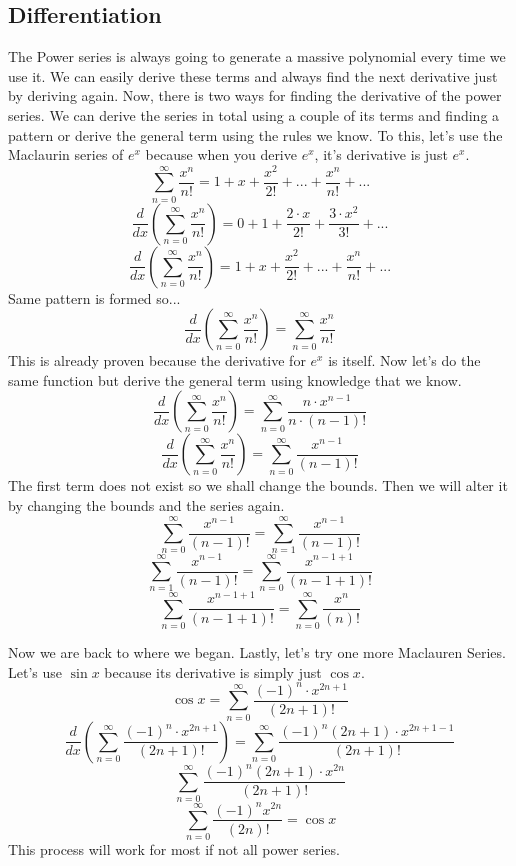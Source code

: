 \documentclass[a4paper,openright, 14pt]{article}
\begin{document}
\subsection{Differentiation}
The Power series is always going to generate a massive polynomial every time we use it. We can easily derive these terms and always find the next derivative just by deriving again. Now, there is two ways for finding the derivative of the power series. We can derive the series in total using a couple of its terms and finding a pattern or derive the general term using the rules we know. To this, let's use the Maclaurin series of $e^x$ because when you derive $e^x$, it's derivative is just $e^x$.
$$\sum _{n=0}^\infty \frac{x^n}{n!}=1+x+\frac{x^2}{2!} +...+\frac{x^n}{n!}+...$$
$$ \frac{d}{dx}(\sum _{n=0}^\infty\frac{x^n}{n!})= 0+1+\frac{2\cdot x}{2!} +\frac{3\cdot x^2}{3!}+ ...$$
$$ \frac{d}{dx}(\sum _{n=0}^\infty\frac{x^n}{n!})=1+x+\frac{x^2}{2!} +...+\frac{x^n}{n!}+...$$
Same pattern is formed so...
$$ \frac{d}{dx}(\sum _{n=0}^\infty\frac{x^n}{n!})=\sum _{n=0}^\infty \frac{x^n}{n!}$$
This is already proven because the derivative for $e^x $ is itself. Now let's do the same function but derive the general term using knowledge that we know.
$$ \frac{d}{dx}(\sum _{n=0}^\infty\frac{x^n}{n!})=\sum _{n=0}^\infty\frac{n \cdot x^{n-1}}{n \cdot (n-1)!}$$
$$ \frac{d}{dx}(\sum _{n=0}^\infty\frac{x^n}{n!})=\sum _{n=0}^\infty\frac{ x^{n-1}}{ (n-1)!}$$
The first term does not exist so we shall change the bounds. Then we will alter it by changing the bounds and the series again. 
$$\sum _{n=0}^\infty\frac{ x^{n-1}}{ (n-1)!}=\sum _{n=1}^\infty\frac{ x^{n-1}}{ (n-1)!}$$
$$\sum _{n=1}^\infty\frac{ x^{n-1}}{ (n-1)!}=\sum _{n=0}^\infty\frac{ x^{n-1+1}}{ (n-1+1)!}$$
$$\sum _{n=0}^\infty\frac{ x^{n-1+1}}{ (n-1+1)!}=\sum _{n=0}^\infty\frac{ x^{n}}{ (n)!}$$

Now we are back to where we began. Lastly, let's try one more Maclauren Series. Let's use $\sin{x}$ because its derivative is simply just $\cos{x}$.
$$\cos{x}=\sum _{n=0} ^\infty \frac{(-1)^n \cdot x^{2n+1}}{(2n+1)!}$$ 
$$\frac{d}{dx}(\sum _{n=0} ^\infty \frac{(-1)^n \cdot x^{2n+1}}{(2n+1)!})=\sum _{n=0} ^\infty \frac{(-1)^n (2n+1)\cdot x^{2n+1-1}}{(2n+1)!}$$ 
$$\sum _{n=0} ^\infty \frac{(-1)^n (2n+1)\cdot x^{2n}}{(2n+1)!}$$ 
$$\sum _{n=0} ^\infty \frac{(-1)^n x^{2n}}{(2n)!}=\cos{x}$$ 
This process will work for most if not all power series.
\\\\
\\\\
\end{document}
